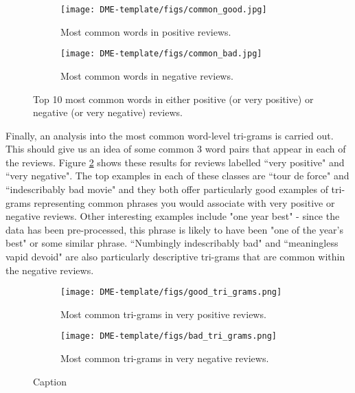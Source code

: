 \documentclass{article}
\begin{document}
\begin{figure}[h]
    \centering
    \begin{subfigure}{0.49\textwidth}
        \centering
\texttt{[image: DME-template/figs/common\_good.jpg]}
        \caption{Most common words in positive reviews.}
    \end{subfigure}
    \begin{subfigure}{0.49\textwidth}
        \centering
        \texttt{[image: DME-template/figs/common\_bad.jpg]}
        \caption{Most common words in negative reviews.}
    \end{subfigure}
    \caption{Top 10 most common words in either positive (or very positive) or negative (or very negative) reviews.}
    \label{fig:common_words}
\end{figure}

Finally, an analysis into the most common word-level tri-grams is carried out. This should give us an idea of some common 3 word pairs that appear in each of the reviews. Figure \ref{fig:tri-grams} shows these results for reviews labelled ``very positive" and ``very negative". The top examples in each of these classes are ``tour de force" and ``indescribably bad movie" and they both offer particularly good examples of tri-grams representing common phrases you would associate with very positive or negative reviews. Other interesting examples include "one year best" - since the data has been pre-processed, this phrase is likely to have been "one of the year's best" or some similar phrase. ``Numbingly indescribably bad" and ``meaningless vapid devoid" are also particularly descriptive tri-grams that are common within the negative reviews. 

\begin{figure}[H]
    \centering
    \begin{subfigure}{0.49\textwidth}
        \centering
\texttt{[image: DME-template/figs/good\_tri\_grams.png]}
        \caption{Most common tri-grams in very positive reviews.}
    \end{subfigure}
    \begin{subfigure}{0.49\textwidth}
        \centering
        \texttt{[image: DME-template/figs/bad\_tri\_grams.png]}
        \caption{Most common tri-grams in very negative reviews.}
    \end{subfigure}
    \caption{Caption}
    \label{fig:tri-grams}
\end{figure}
\end{document}
